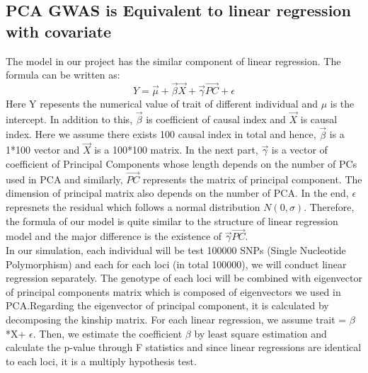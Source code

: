 \documentclass[12pt]{article}
\theoremstyle{definition}
\theoremstyle{plain}
\begin{document}
\subsection{PCA GWAS  is Equivalent to linear regression with covariate}
The model in our project has the similar component of linear regression. The formula can be written as:
$$Y=\vec{\mu} +\vec{ \beta}\vec{X}+\vec{	\gamma}\vec{PC}+\epsilon $$
Here Y repesents the numerical value of trait of different individual and $\mu$ is the intercept. In addition to this, $\vec{ \beta}$ is coefficient of causal index and $\vec{ X}$ is causal index. Here we assume there exists 100 causal index in total and hence, $\vec{ \beta}$ is a 1*100 vector and $\vec{ X}$ is a 100*100 matrix. In the next part, $\vec{\gamma}$ is a vector of coefficient of Principal Components whose length depends on the number of PCs used in PCA and similarly, $\vec{PC}$ represents the matrix of principal component. The dimension of principal matrix also depends on the number of PCA. In the end, $\epsilon$ represnets the residual which follows a normal distribution $N(0,\sigma)$. Therefore, the formula of our model is quite similar to the structure of linear regression model and the major difference is the existence of $\vec{	\gamma}\vec{PC}$.\\
In our simulation, each individual will be test 100000 SNPs (Single Nucleotide Polymorphism) and each for each loci (in total 100000), we will conduct linear regression separately.  The genotype of each loci will be combined with eigenvector of principal components matrix which is composed of eigenvectors we used in PCA.Regarding the eigenvector of principal component, it is calculated by decomposing the kinship matrix.  For each linear regression, we assume trait = $ \beta $*X+ $\epsilon$. Then, we estimate the coefficient $\beta$ by least square estimation and calculate the p-value through F statistics and since linear regressions are identical to each loci, it is a multiply hypothesis test. 
\end{document}

